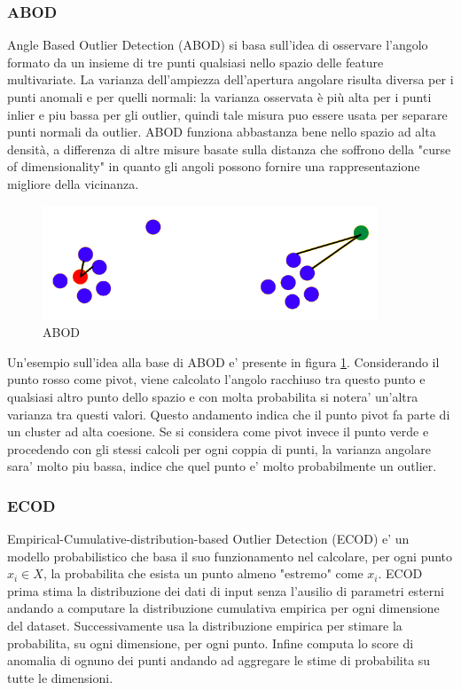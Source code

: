 \subsubsection{ABOD}
Angle Based Outlier Detection (ABOD) si basa sull'idea di osservare l'angolo formato da un insieme di tre punti qualsiasi nello spazio delle feature multivariate. La varianza dell'ampiezza dell'apertura angolare risulta diversa per i punti anomali e per quelli normali: la varianza osservata è più alta per i punti inlier e piu bassa per gli outlier, quindi tale misura puo essere usata per separare punti normali da outlier. ABOD funziona abbastanza bene nello spazio ad alta densità, a differenza di altre misure basate sulla distanza che soffrono della "curse of dimensionality" in quanto gli angoli possono fornire una rappresentazione migliore della vicinanza.
\begin{figure}[t]
	\centering
	\includegraphics[width=10cm, scale=1]{images/abod}
	\caption{ABOD}
	\label{abod}
\end{figure}
Un'esempio sull'idea alla base di ABOD e' presente in figura \ref{abod}.
Considerando il punto rosso come pivot, viene calcolato l'angolo racchiuso tra questo punto e qualsiasi altro punto dello spazio e con molta probabilita si notera' un'altra varianza tra questi valori. Questo andamento indica che il punto pivot fa parte di un cluster ad alta coesione.
Se si considera come pivot invece il punto verde e procedendo con gli stessi calcoli per ogni coppia di punti, la varianza angolare sara' molto piu bassa, indice che quel punto e' molto probabilmente un outlier.

\subsubsection{ECOD}
Empirical-Cumulative-distribution-based Outlier Detection (ECOD) e' un modello probabilistico che basa il suo funzionamento nel calcolare, per ogni punto $x_i \in X$, la probabilita che esista un punto almeno "estremo" come $x_i$.
ECOD prima stima la distribuzione dei dati di input senza l'ausilio di parametri esterni andando a computare la distribuzione cumulativa empirica per ogni dimensione del dataset. Successivamente usa la distribuzione empirica per stimare la probabilita, su ogni dimensione, per ogni punto. Infine computa lo score di anomalia di ognuno dei punti andando ad aggregare le stime di probabilita su tutte le dimensioni.

